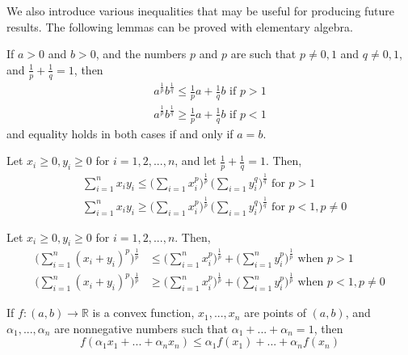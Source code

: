   We also introduce various inequalities that may be useful for producing future results. The following lemmas can be proved with elementary algebra. 

  \begin{lemma}
    If $a>0$ and $b>0$, and the numbers $p$ and $p$ are such that $p \neq 0, 1$ and $q \neq 0, 1$, and $\frac{1}{p} + \frac{1}{q} = 1$, then 
    \begin{align*}
        a^{\frac{1}{p}} b^{\frac{1}{q}} \leq \frac{1}{p} a + \frac{1}{q} b \text{  if } p > 1 \\
        a^{\frac{1}{p}} b^{\frac{1}{q}} \geq \frac{1}{p} a + \frac{1}{q} b \text{  if } p < 1
    \end{align*}
    and equality holds in both cases if and only if $a = b$. 
  \end{lemma}

  \begin{lemma}
    Let $x_i \geq 0, y_i \geq 0$ for $i = 1, 2, ..., n$, and let $\frac{1}{p} + \frac{1}{q} = 1$. Then, 
    \begin{align*}
        &\sum_{i=1}^n x_i y_i \leq \bigg( \sum_{i=1} x_i^p \bigg)^{\frac{1}{p}} \, \bigg( \sum_{i=1} y_i^q \bigg)^{\frac{1}{q}} \text{  for } p > 1 \\
        &\sum_{i=1}^n x_i y_i \geq \bigg( \sum_{i=1} x_i^p \bigg)^{\frac{1}{p}} \, \bigg( \sum_{i=1} y_i^q \bigg)^{\frac{1}{q}} \text{  for } p < 1, p \neq 0
    \end{align*}
  \end{lemma}

  \begin{lemma}
    Let $x_i \geq 0, y_i \geq 0$ for $i = 1, 2, ... ,n$. Then, 
    \begin{align*}
        \bigg( \sum_{i=1}^n (x_i + y_i)^p \bigg)^{\frac{1}{p}} & \leq \bigg( \sum_{i=1}^n x_i^p \bigg)^\frac{1}{p} + \bigg( \sum_{i=1}^n y_i^p \bigg)^{\frac{1}{p}} \text{  when } p > 1 \\
        \bigg( \sum_{i=1}^n (x_i + y_i)^p \bigg)^{\frac{1}{p}} & \geq \bigg( \sum_{i=1}^n x_i^p \bigg)^\frac{1}{p} + \bigg( \sum_{i=1}^n y_i^p \bigg)^{\frac{1}{p}} \text{  when } p < 1, p \neq 0
    \end{align*}
  \end{lemma}

  \begin{proposition}
    If $f: (a, b) \longrightarrow \mathbb{R}$ is a convex function, $x_1, ..., x_n$ are points of $(a, b)$, and $\alpha_1, ..., \alpha_n$ are nonnegative numbers such that $\alpha_1 + ... + \alpha_n = 1$, then 
    \[f(\alpha_1 x_1 + ... + \alpha_n x_n) \leq \alpha_1 f(x_1) + ... + \alpha_n f(x_n)\]
  \end{proposition}

